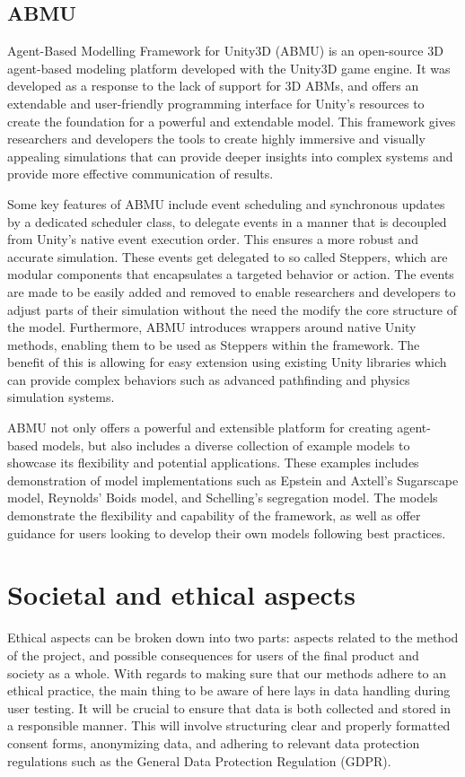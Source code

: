     \subsection{ABMU}
        Agent-Based Modelling Framework for Unity3D (ABMU) is an open-source 3D agent-based modeling platform developed with the Unity3D game engine\cite{unity2021manual}. It was developed as a response to the lack of support for 3D ABMs\cite{abmu-paper}, and offers an extendable and user-friendly programming interface for Unity’s resources to create the foundation for a powerful and extendable model\cite{abmu2021}. This framework gives researchers and developers the tools to create highly immersive and visually appealing simulations that can provide deeper insights into complex systems and provide more effective communication of results.

        Some key features of ABMU include event scheduling and synchronous updates by a dedicated scheduler class, to delegate events in a manner that is decoupled from Unity’s native event execution order. This ensures a more robust and accurate simulation. These events get delegated to so called Steppers, which are modular components that encapsulates a targeted behavior or action. The events are made to be easily added and removed to enable researchers and developers to adjust parts of their simulation without the need the modify the core structure of the model. Furthermore, ABMU introduces wrappers around native Unity methods, enabling them to be used as Steppers within the framework. The benefit of this is allowing for easy extension using existing Unity libraries which can provide complex behaviors such as advanced pathfinding and physics simulation systems.

        ABMU not only offers a powerful and extensible platform for creating agent-based models, but also includes a diverse collection of example models to showcase its flexibility and potential applications. These examples includes demonstration of model implementations such as Epstein and Axtell's Sugarscape model\cite{epstein1996growing}, Reynolds' Boids model\cite{reynolds1987flocks}, and Schelling's segregation model\cite{schelling1971dynamic}. The models demonstrate the flexibility and capability of the framework, as well as offer guidance for users looking to develop their own models following best practices.
\section{Societal and ethical aspects}\label{ethics}
    Ethical aspects can be broken down into two parts: aspects related to the method of the project, and possible consequences for users of the final product and society as a whole.  With regards to making sure that our methods adhere to an ethical practice, the main thing to be aware of here lays in data handling during user testing. It will be crucial to ensure that data is both collected and stored in a responsible manner. This will involve structuring clear and properly formatted consent forms\cite{ico2021consent}, anonymizing data, and adhering to relevant data protection regulations such as the General Data Protection Regulation (GDPR)\cite{gdpr2016}.

